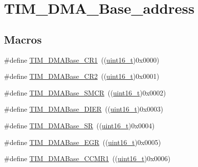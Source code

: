 \hypertarget{group___t_i_m___d_m_a___base__address}{}\section{T\+I\+M\+\_\+\+D\+M\+A\+\_\+\+Base\+\_\+address}
\label{group___t_i_m___d_m_a___base__address}
\subsection*{Macros}
\begin{DoxyCompactItemize}
\item 
\#define \hyperlink{group___t_i_m___d_m_a___base__address_ga73bca5b14da2d5026fa3877d0db53740}{T\+I\+M\+\_\+\+D\+M\+A\+Base\+\_\+\+C\+R1}~((\hyperlink{_p_e___types_8h_a1f1825b69244eb3ad2c7165ddc99c956}{uint16\+\_\+t})0x0000)
\item 
\#define \hyperlink{group___t_i_m___d_m_a___base__address_ga50e894f0d2cecc1ff3a3578098c3246e}{T\+I\+M\+\_\+\+D\+M\+A\+Base\+\_\+\+C\+R2}~((\hyperlink{_p_e___types_8h_a1f1825b69244eb3ad2c7165ddc99c956}{uint16\+\_\+t})0x0001)
\item 
\#define \hyperlink{group___t_i_m___d_m_a___base__address_ga748e24ac0675caa55869d6ba506448df}{T\+I\+M\+\_\+\+D\+M\+A\+Base\+\_\+\+S\+M\+CR}~((\hyperlink{_p_e___types_8h_a1f1825b69244eb3ad2c7165ddc99c956}{uint16\+\_\+t})0x0002)
\item 
\#define \hyperlink{group___t_i_m___d_m_a___base__address_gaeddacbbc2adf9705feac250f077d8c93}{T\+I\+M\+\_\+\+D\+M\+A\+Base\+\_\+\+D\+I\+ER}~((\hyperlink{_p_e___types_8h_a1f1825b69244eb3ad2c7165ddc99c956}{uint16\+\_\+t})0x0003)
\item 
\#define \hyperlink{group___t_i_m___d_m_a___base__address_ga5cda07a11a76bbb24a7d5bb680814d31}{T\+I\+M\+\_\+\+D\+M\+A\+Base\+\_\+\+SR}~((\hyperlink{_p_e___types_8h_a1f1825b69244eb3ad2c7165ddc99c956}{uint16\+\_\+t})0x0004)
\item 
\#define \hyperlink{group___t_i_m___d_m_a___base__address_gab5e6f6c3fea100896d13ce317a6ccd8e}{T\+I\+M\+\_\+\+D\+M\+A\+Base\+\_\+\+E\+GR}~((\hyperlink{_p_e___types_8h_a1f1825b69244eb3ad2c7165ddc99c956}{uint16\+\_\+t})0x0005)
\item 
\#define \hyperlink{group___t_i_m___d_m_a___base__address_gaab384496cff3e54d8179fc0db727c7ee}{T\+I\+M\+\_\+\+D\+M\+A\+Base\+\_\+\+C\+C\+M\+R1}~((\hyperlink{_p_e___types_8h_a1f1825b69244eb3ad2c7165ddc99c956}{uint16\+\_\+t})0x0006)
\item 

\end{DoxyCompactItemize}
